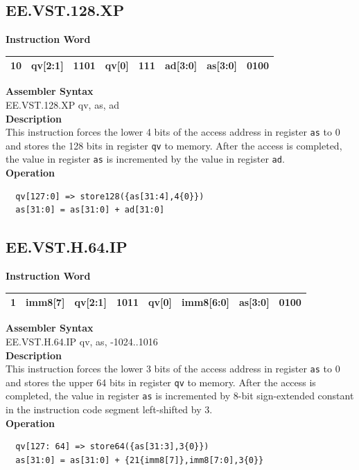 \clearpage
\subsection{EE.VST.128.XP}\label{instruction:EEVST128XP}
\setlength\tabcolsep{6pt}
\textbf{Instruction Word} \\
\begin{tabular}{|c|c|c|c|c|c|c|c|}
	\hline
	10 & qv[2:1] & 1101 & qv[0] & 111 & ad[3:0] & as[3:0] & 0100 \\
	\hline
\end{tabular}

\textbf{Assembler Syntax} \\
EE.VST.128.XP qv, as, ad \\
\textbf{Description} \\
This instruction forces the lower 4 bits of the access address in register \lstinline{as} to 0 and stores the 128 bits in register \lstinline{qv} to memory. After the access is completed, the value in register \lstinline{as} is incremented by the value in register \lstinline{ad}.\\
\textbf{Operation}
\begin{lstlisting}
  qv[127:0] => store128({as[31:4],4{0}})
  as[31:0] = as[31:0] + ad[31:0]
\end{lstlisting}

\clearpage
\subsection{EE.VST.H.64.IP}\label{instruction:EEVSTH64IP}
\setlength\tabcolsep{6pt}
\textbf{Instruction Word} \\
\begin{tabular}{|c|c|c|c|c|c|c|c|}
	\hline
	1 & imm8[7] & qv[2:1] & 1011 & qv[0] & imm8[6:0] & as[3:0] & 0100 \\
	\hline
\end{tabular}

\textbf{Assembler Syntax} \\
EE.VST.H.64.IP qv, as, -1024..1016 \\
\textbf{Description} \\
This instruction forces the lower 3 bits of the access address in register \lstinline{as} to 0 and stores the upper 64 bits in register \lstinline{qv} to memory. After the access is completed, the value in register \lstinline{as} is incremented by 8-bit sign-extended constant in the instruction code segment left-shifted by 3.\\
\textbf{Operation}
\begin{lstlisting}
  qv[127: 64] => store64({as[31:3],3{0}})
  as[31:0] = as[31:0] + {21{imm8[7]},imm8[7:0],3{0}}
\end{lstlisting}


